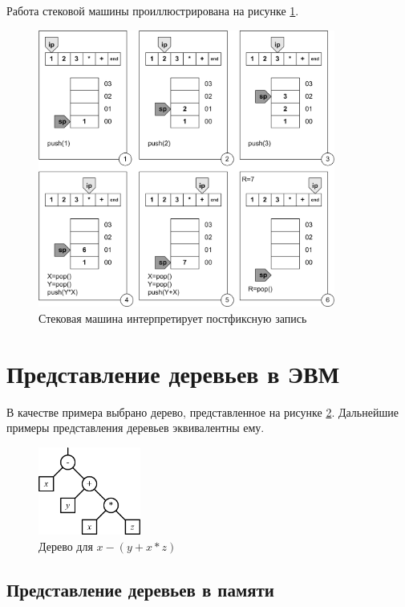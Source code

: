 Работа стековой машины проиллюстрирована на рисунке \ref{fig:rec:stackMachine}.

\begin{figure}
    \centering
    \includegraphics[width=0.87\textwidth]{fig/stackMachine.png}
    \caption{Стековая машина интерпретирует постфиксную запись}
    \label{fig:rec:stackMachine}
\end{figure}


\section{Представление деревьев в ЭВМ}

В качестве примера выбрано дерево, представленное на рисунке \ref{fig:rec:treeRepBase}. Дальнейшие примеры представления деревьев эквивалентны ему.
\begin{figure}
    \centering
    \includegraphics[width=0.3\textwidth]{fig/treeRepBase.png}
    \caption{Дерево для $x-(y+x*z)$}
    \label{fig:rec:treeRepBase}
\end{figure}


\subsection{Представление деревьев в памяти}

